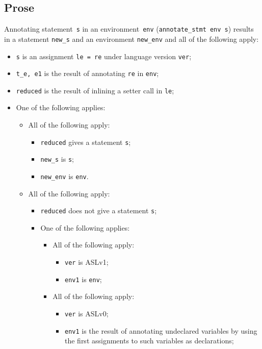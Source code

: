 \documentclass{book}
\begin{document}
\begin{itemize}
  \subsection{Prose}
Annotating statement~\texttt{s} in an environment~\texttt{env}
(\texttt{annotate\_stmt env s}) results in a statement \texttt{new\_s} and an
environment \texttt{new\_env} and all of the following apply:
   \begin{itemize}
   \item \texttt{s} is an assignment \texttt{le = re} under language version \texttt{ver};
   \item \texttt{t\_e, e1} is the result of annotating \texttt{re} in \texttt{env};
   \item \texttt{reduced} is the result of inlining a setter call in \texttt{le};
   \item One of the following applies:
     \begin{itemize}
     \item All of the following apply:
       \begin{itemize}
       \item \texttt{reduced} gives a statement \texttt{s};
       \item \texttt{new\_s} is \texttt{s};
       \item \texttt{new\_env} is \texttt{env}.
       \end{itemize}

     \item All of the following apply:
       \begin{itemize}
       \item \texttt{reduced} does not give a statement \texttt{s};
       \item One of the following applies:
         \begin{itemize}
         \item All of the following apply:
           \begin{itemize}
           \item \texttt{ver} is ASLv1;
           \item \texttt{env1} is \texttt{env};
           \end{itemize}
         \item All of the following apply:
           \begin{itemize}
           \item \texttt{ver} is ASLv0;
	   \item \texttt{env1} is the result of annotating undeclared variables by using
	      the first assignments to such variables as declarations;
           \end{itemize}
         \end{itemize}


\end{itemize}
\end{itemize}
\end{itemize}
\end{itemize}
\end{document}
